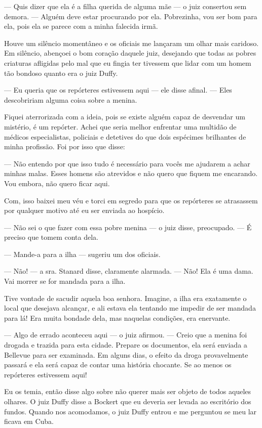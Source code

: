 --- Quis dizer que ela é a filha querida de alguma mãe --- o juiz
consertou sem demora. --- Alguém deve estar procurando por ela.
Pobrezinha, vou ser bom para ela, pois ela se parece com a minha
falecida irmã.

Houve um silêncio momentâneo e os oficiais me lançaram um olhar mais
caridoso. Em silêncio, abençoei o bom coração daquele juiz, desejando
que todas as pobres criaturas afligidas pelo mal que eu fingia ter
tivessem que lidar com um homem tão bondoso quanto era o juiz Duffy.

--- Eu queria que os repórteres estivessem aqui --- ele disse afinal.
--- Eles descobririam alguma coisa sobre a menina.

Fiquei aterrorizada com a ideia, pois se existe alguém capaz de
desvendar um mistério, é um repórter. Achei que seria melhor enfrentar
uma multidão de médicos especialistas, policiais e detetives do que dois
espécimes brilhantes de minha profissão. Foi por isso que disse:

--- Não entendo por que isso tudo é necessário para vocês me ajudarem a
achar minhas malas. Esses homens são atrevidos e não quero que fiquem me
encarando. Vou embora, não quero ficar aqui.

Com, isso baixei meu véu e torci em segredo para que os repórteres se
atrasassem por qualquer motivo até eu ser enviada ao hospício.

--- Não sei o que fazer com essa pobre menina --- o juiz disse,
preocupado. --- É preciso que tomem conta dela.

--- Mande-a para a ilha --- sugeriu um dos oficiais.

--- Não! --- a sra. Stanard disse, claramente alarmada. --- Não! Ela é
uma dama. Vai morrer se for mandada para a ilha.

Tive vontade de sacudir aquela boa senhora. Imagine, a ilha era
exatamente o local que desejava alcançar, e ali estava ela tentando me
impedir de ser mandada para lá! Era muita bondade dela, mas naquelas
condições, era enervante.

--- Algo de errado aconteceu aqui --- o juiz afirmou. --- Creio que a
menina foi drogada e trazida para esta cidade. Prepare os documentos,
ela será enviada a Bellevue para ser examinada. Em alguns dias, o efeito
da droga provavelmente passará e ela será capaz de contar uma história
chocante. Se ao menos os repórteres estivessem aqui!

Eu os temia, então disse algo sobre não querer mais ser objeto de todos
aqueles olhares. O juiz Duffy disse a Bockert que eu deveria ser levada
ao escritório dos fundos. Quando nos acomodamos, o juiz Duffy entrou e
me perguntou se meu lar ficava em Cuba.

